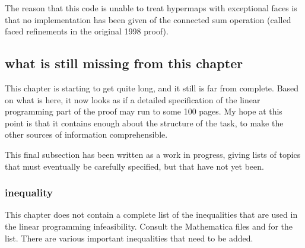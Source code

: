 The reason that this code is unable to treat hypermaps with
exceptional faces is that no implementation has been given of the
connected sum operation (called faced refinements in the original 1998
proof).


\subsection {what is still missing from this chapter}

This chapter is starting to get quite long, and it still is far
from complete.  Based on what is here, it now looks as if a
detailed specification of the linear programming part of the proof
may run to some 100 pages. My hope at this point is that it
contains enough about the structure of the task, to make the other
sources of information comprehensible.

This final subsection has been written as a work in progress,
giving lists of topics that must eventually be carefully
specified, but that have not yet been.

\subsubsection{inequality}

This chapter does not contain a complete list of the inequalities
that are used in the linear programming infeasibility.  Consult
the Mathematica files and \cite{DCG} for the list.  There are
various important inequalities that need to be added.

